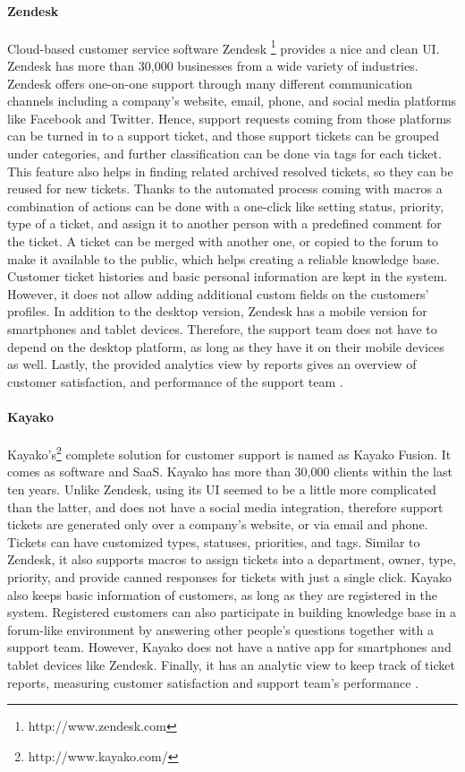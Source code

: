 \paragraph{Zendesk}
Cloud-based customer service software Zendesk \footnote{http://www.zendesk.com} provides a nice and clean \ac{UI}. Zendesk has more than 30,000 businesses from a wide variety of industries. Zendesk offers one-on-one support through many different communication channels including a company's website, email, phone, and social media platforms like Facebook and Twitter. Hence, support requests coming from those platforms can be turned in to a support ticket, and those support tickets can be grouped under categories, and further classification can be done via tags for each ticket. This feature also helps in finding related archived resolved tickets, so they can be reused for new tickets. Thanks to the automated process coming with macros a combination of actions can be done with a one-click like setting status, priority, type of a ticket, and assign it to another person with a predefined comment for the ticket. A ticket can be merged with another one, or copied to the forum to make it available to the public, which helps creating a reliable knowledge base. Customer ticket histories and basic personal information are kept in the system. However, it does not allow adding additional custom fields on the customers' profiles. In addition to the desktop version, Zendesk has a mobile version for smartphones and tablet devices. Therefore, the support team does not have to depend on the desktop platform, as long as they have it on their mobile devices as well. Lastly, the provided analytics view by reports gives an overview of customer satisfaction, and performance of the support team \citep{Zendesk2013,Zendesk2013a}.

\paragraph{Kayako}
Kayako's\footnote{http://www.kayako.com/} complete solution for customer support is named as Kayako Fusion. It comes as software and \ac{SaaS}. Kayako has more than 30,000 clients within the last ten years. Unlike Zendesk, using its \ac{UI} seemed to be a little more complicated than the latter, and does not have a social media integration, therefore support tickets are generated only over a company's website, or via email and phone. Tickets can have customized types, statuses, priorities, and tags. Similar to Zendesk, it also supports macros to assign tickets into a department, owner, type, priority, and provide canned responses for tickets with just a single click. Kayako also keeps basic information of customers, as long as they are registered in the system. Registered customers can also participate in building knowledge base in a forum-like environment by answering other people's questions together with a support team. However, Kayako does not have a native app for smartphones and tablet devices like Zendesk. Finally, it has an analytic view to keep track of ticket reports, measuring customer satisfaction and support team's performance \citep{KayakoInc.2013,KayakoInc.2013a}.

